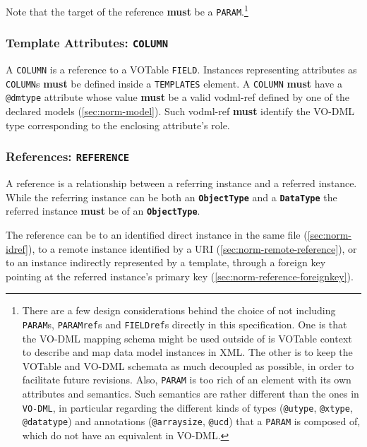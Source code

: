 \documentclass[11pt,a4paper]{ivoa}
\begin{document}
Note that the target of the reference \textbf{must} be a
\texttt{PARAM}.\footnote{There are a few design considerations behind
  the choice of not including \texttt{PARAM}s, \texttt{PARAMref}s and
  \texttt{FIELDref}s directly in this specification. One is that the
  VO-DML mapping schema might be used outside of is VOTable context to
  describe and map data model instances in XML. The other is to keep the
  VOTable and VO-DML schemata as much decoupled as possible, in order to
  facilitate future revisions. Also, \texttt{PARAM} is too rich of an
  element with its own attributes and semantics. Such semantics are
  rather different than the ones in \texttt{VO-DML}, in particular
  regarding the different kinds of types (\texttt{@utype},
  \texttt{@xtype}, \texttt{@datatype}) and annotations
  (\texttt{@arraysize}, \texttt{@ucd}) that a \texttt{PARAM} is composed
  of, which do not have an equivalent in VO-DML.}

\subsubsection{Template Attributes:
\texttt{COLUMN}}\label{sec:norm-column}

A \texttt{COLUMN} is a reference to a VOTable \texttt{FIELD}. Instances
representing attributes as \texttt{COLUMN}s \textbf{must} be defined
inside a \texttt{TEMPLATES} element. A \texttt{COLUMN} \textbf{must}
have a \texttt{@dmtype} attribute whose value \textbf{must} be a valid
vodml-ref defined by one of the declared models (\ref{sec:norm-model}).
Such vodml-ref \textbf{must} identify the VO-DML type corresponding to
the enclosing attribute's role.

\subsubsection{References: \texttt{REFERENCE}}\label{sec:norm-reference}

A reference is a relationship between a referring instance and a
referred instance. While the referring instance can be both an
\textbf{\texttt{ObjectType}} and a \textbf{\texttt{DataType}} the
referred instance \textbf{must} be of an \textbf{\texttt{ObjectType}}.

The reference can be to an identified direct instance in the same file
(\ref{sec:norm-idref}), to a remote instance identified by a URI
(\ref{sec:norm-remote-reference}), or to an instance indirectly
represented by a template, through a foreign key pointing at the
referred instance's primary key (\ref{sec:norm-reference-foreignkey}).
\end{document}
